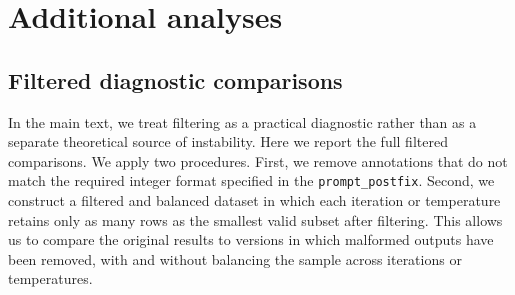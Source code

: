 \begin{table}[!h]
\centering
\caption{Estimated Total API Cost for Various Models}
\centering
{}
\label{table:altlmcosts}
\end{table}

\section{Additional analyses}

\subsection{Filtered diagnostic comparisons}

In the main text, we treat filtering as a practical diagnostic rather than as a separate theoretical source of instability. Here we report the full filtered comparisons. We apply two procedures. First, we remove annotations that do not match the required integer format specified in the \texttt{prompt\_postfix}. Second, we construct a filtered and balanced dataset in which each iteration or temperature retains only as many rows as the smallest valid subset after filtering. This allows us to compare the original results to versions in which malformed outputs have been removed, with and without balancing the sample across iterations or temperatures.

